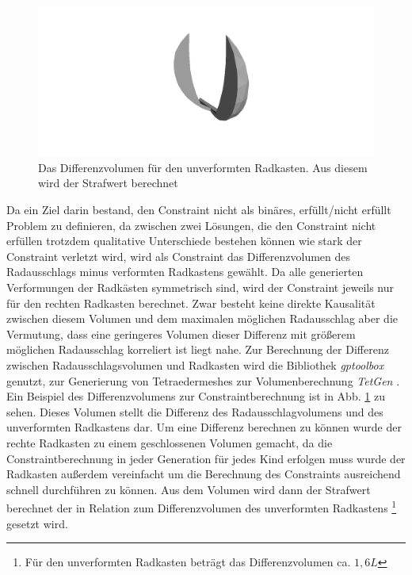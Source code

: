 \begin{figure}[h]
	\centering
	\includegraphics[width=.5\linewidth]{bilder/difference.png}
	\caption{Das Differenzvolumen für den unverformten Radkasten. Aus diesem wird der Strafwert berechnet}
	\label{fig:diff_volume}
\end{figure}
Da ein Ziel darin bestand, den Constraint nicht als binäres, erfüllt/nicht erfüllt Problem zu definieren, da zwischen zwei Lösungen, die den Constraint nicht erfüllen trotzdem qualitative Unterschiede bestehen können wie stark der Constraint verletzt wird, wird als Constraint das Differenzvolumen des Radausschlags minus verformten Radkastens gewählt.
Da alle generierten Verformungen der Radkästen symmetrisch sind, wird der Constraint jeweils nur für den rechten Radkasten berechnet.
Zwar besteht keine direkte Kausalität zwischen diesem Volumen und dem maximalen möglichen Radausschlag aber die Vermutung, dass eine geringeres Volumen dieser Differenz mit größerem möglichen Radausschlag korreliert ist liegt nahe.
Zur Berechnung der Differenz zwischen Radausschlagsvolumen und Radkasten wird die Bibliothek \textit{gptoolbox} \cite{gptoolbox.b} genutzt, zur Generierung von Tetraedermeshes zur Volumenberechnung \textit{TetGen} \cite{Si.2015}.
Ein Beispiel des Differenzvolumens zur Constraintberechnung ist in Abb. \ref{fig:diff_volume} zu sehen.
Dieses Volumen stellt die Differenz des Radausschlagvolumens und des unverformten Radkastens dar.
Um eine Differenz berechnen zu können wurde der rechte Radkasten zu einem geschlossenen Volumen gemacht, da die Constraintberechnung in jeder Generation für jedes Kind erfolgen muss wurde der Radkasten außerdem vereinfacht um die Berechnung  des Constraints ausreichend schnell durchführen zu können.
Aus dem Volumen wird dann der Strafwert berechnet der in Relation zum Differenzvolumen des unverformten Radkastens
\footnote{Für den unverformten Radkasten beträgt das Differenzvolumen ca. $1,6L$} gesetzt wird.

